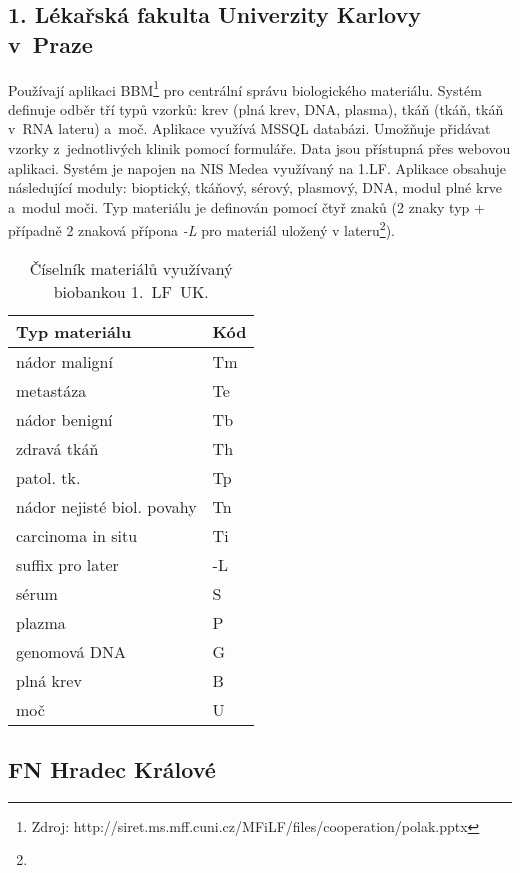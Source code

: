 \subsection{1. Lékařská fakulta Univerzity Karlovy v~Praze}
Používají aplikaci BBM\footnote{Zdroj: http://siret.ms.mff.cuni.cz/MFiLF/files/cooperation/polak.pptx} pro centrální správu biologického materiálu. Systém definuje odběr tří typů vzorků: krev (plná krev, DNA, plasma), tkáň (tkáň, tkáň v~RNA lateru) a~moč. Aplikace využívá MSSQL databázi. Umožňuje přidávat vzorky z~jednotlivých klinik pomocí formuláře. Data jsou přístupná přes webovou aplikaci.
Systém je napojen na NIS Medea využívaný na 1.LF. 
Aplikace obsahuje následující moduly:  bioptický, tkáňový, sérový, plasmový, DNA, modul plné krve a~modul moči.
Typ materiálu je definován pomocí čtyř znaků (2 znaky typ + případně 2 znaková přípona \textit{-L} pro materiál uložený v lateru\footnote{}).
\begin{table}[ht] 
\centering
\begin{tabular}{l l}
\hline 
Typ materiálu & Kód \\
\hline \hline
nádor maligní 							& Tm 	\\
metastáza 									& Te 	\\
nádor benigní 							& Tb 	\\
zdravá tkáň 								& Th 	\\
patol. tk. 									& Tp 	\\
nádor nejisté biol. povahy 	& Tn 	\\
carcinoma in situ 					& Ti 	\\
suffix pro later 						& -L 	\\
sérum 											& S~	\\
plazma 											& P 	\\
genomová DNA 								& G 	\\
plná krev 									& B 	\\
moč 												& U~	\\

\hline %
\end{tabular} 
\caption{Číselník materiálů využívaný biobankou 1.~LF~UK.}
\label{tab:ciselnik-mat-Ilfuk} %
\end{table} 


\subsection{FN Hradec Králové}

